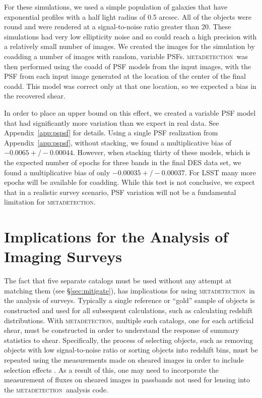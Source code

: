 \documentclass[iop, appendixfloats, numberedappendix, apj]{emulateapj}
\newcommand{\mdet}{\textsc{metadetection}}
\begin{document}
For these simulations, we used a simple population of galaxies that have
exponential profiles with a half light radius of 0.5 arcsec. All of the objects
were round and were rendered at a signal-to-noise ratio greater than 20. These
simulations had very low ellipticity noise and so could reach a high precision
with a relatively small number of images. We created the images for the
simulation by coadding a number of images with random, variable PSFs.  \mdet\
was then performed using the coadd of PSF models from the input images, with
the PSF from each input image generated at the location of the center of the
final coadd.  This model was correct only at that one location, so we expected
a bias in the recovered shear.

In order to place an upper bound on this effect, we created a variable PSF
model that had significantly more variation than we expect in real data. See
Appendix~\ref{app:pspsf} for details.  Using a single PSF realization from
Appendix~\ref{app:pspsf}, without stacking, we found a multiplicative bias of
$-0.0065 +/- 0.00044$.  However, when stacking thirty of these models, which is
the expected number of epochs for three bands in the final DES data set, we
found a multiplicative bias of only $-0.00035 +/- 0.00037$.  For LSST many more
epochs will be available for coadding.   While this test is not conclusive, we
expect that in a realistic survey scenario, PSF variation will not be a
fundamental limitation for \mdet.

\section{Implications for the Analysis of Imaging Surveys} \label{sec:wavg}

The fact that five separate catalogs must be used without any attempt at
matching them (see \S \ref{sec:mitigate}), has implications for using \mdet\ in
the analysis of surveys.  Typically a single reference or ``gold'' sample of
objects is constructed and used for all subsequent calculations, such as
calculating redshift distributions.  With \mdet, multiple such catalogs, one
for each artificial shear, must be constructed in order to understand the
response of summary statistics to shear.  Specifically, the process of
selecting objects, such as removing objects with low signal-to-noise ratio or
sorting objects into redshift bins, must be repeated using the measurements made on
sheared images in order to include selection effects \citep{SheldonMcal2017}.
As a result of this, one may need to incorporate the measurement of fluxes
on sheared images in passbands not used for lensing into the \mdet\ analysis
code.
\end{document}
